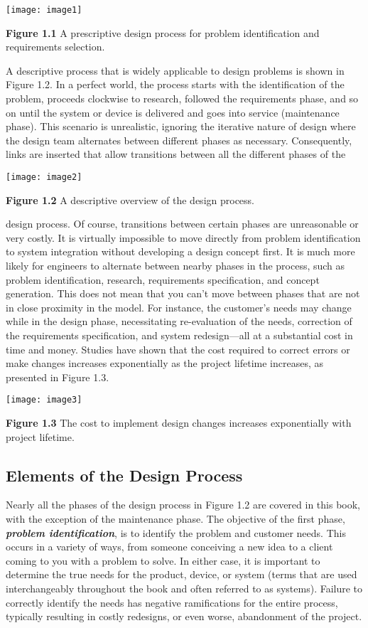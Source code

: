 \texttt{[image: image1]}

\textbf{Figure 1.1} A prescriptive design process for problem
identification and requirements selection.

A descriptive process that is widely applicable to design problems is
shown in Figure 1.2. In a perfect world, the process starts with the
identification of the problem, proceeds clockwise to research, followed
the requirements phase, and so on until the system or device is
delivered and goes into service (maintenance phase). This scenario is
unrealistic, ignoring the iterative nature of design where the design
team alternates between different phases as necessary. Consequently,
links are inserted that allow transitions between all the different
phases of the

\texttt{[image: image2]}

\textbf{Figure 1.2} A descriptive overview of the design process.

design process. Of course, transitions between certain phases are
unreasonable or very costly. It is virtually impossible to move directly
from problem identification to system integration without developing a
design concept first. It is much more likely for engineers to alternate
between nearby phases in the process, such as problem identification,
research, requirements specification, and concept generation. This does
not mean that you can't move between phases that are not in close
proximity in the model. For instance, the customer's needs may change
while in the design phase, necessitating re-evaluation of the needs,
correction of the requirements specification, and system redesign---all
at a substantial cost in time and money. Studies have shown that the
cost required to correct errors or make changes increases exponentially
as the project lifetime increases, as presented in Figure 1.3.

\texttt{[image: image3]}

\textbf{Figure 1.3} The cost to implement design changes increases
exponentially with project lifetime.

\subsection{Elements of the Design Process}

Nearly all the phases of the design process in Figure 1.2 are covered in
this book, with the exception of the maintenance phase. The objective of
the first phase, \emph{\textbf{problem identification}}, is to identify
the problem and customer needs. This occurs in a variety of ways, from
someone conceiving a new idea to a client coming to you with a problem
to solve. In either case, it is important to determine the true needs
for the product, device, or system (terms that are used interchangeably
throughout the book and often referred to as systems). Failure to
correctly identify the needs has negative ramifications for the entire
process, typically resulting in costly redesigns, or even worse,
abandonment of the project.

